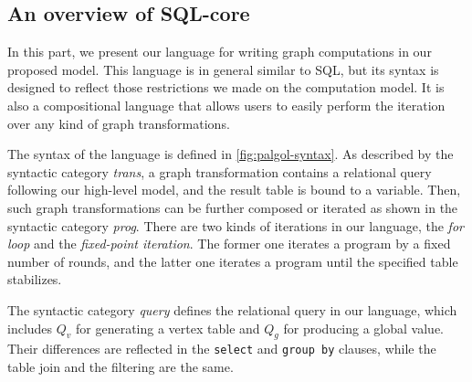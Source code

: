 \documentclass{sokendai_thesis} %
\begin{document}
\subsection{An overview of SQL-core}

In this part, we present our language for writing graph computations in our proposed model.
This language is in general similar to SQL, but its syntax is designed to reflect those restrictions we made on the computation model.
It is also a compositional language that allows users to easily perform the iteration over any kind of graph transformations.


The syntax of the language is defined in \autoref{fig:palgol-syntax}.
As described by the syntactic category \textit{trans}, a graph transformation contains a relational query following our high-level model, and the result table is bound to a variable.
Then, such graph transformations can be further composed or iterated %
as shown in the syntactic category \textit{prog}.
There are two kinds of iterations in our language, the \textit{for loop} and the \textit{fixed-point iteration}.
The former one iterates a program by a fixed number of rounds, and the latter one iterates a program until the specified table stabilizes.

The syntactic category \textit{query} defines the relational query in our language, which includes $Q_v$ for generating a vertex table and $Q_g$ for producing a global value.
Their differences are reflected in the \texttt{select} and \texttt{group by} clauses, while the table join and the filtering are the same.
\end{document}
